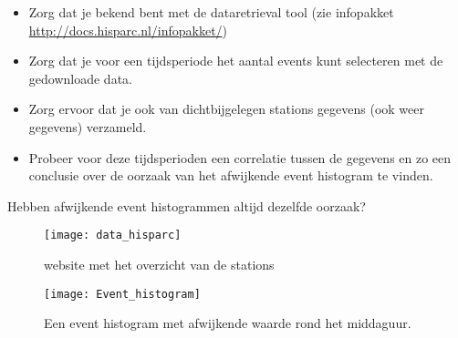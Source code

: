 \begin{questions}
\begin{EnvUplevel}
\begin{itemize}
    \item Zorg dat je bekend bent met de dataretrieval tool
    (zie infopakket \url{http://docs.hisparc.nl/infopakket/})
    \item Zorg dat je voor een tijdsperiode het aantal events kunt selecteren met de gedownloade data.
    \item Zorg ervoor dat je ook van dichtbijgelegen stations gegevens (ook
    weer gegevens) verzameld.
    \item Probeer voor deze tijdsperioden een
    correlatie tussen de gegevens en zo een conclusie over de oorzaak van
    het afwijkende event histogram te vinden.
\end{itemize}
\end{EnvUplevel}



\question Hebben afwijkende event histogrammen altijd dezelfde oorzaak?

\begin{figure}
    \centering
    \texttt{[image: data\_hisparc]}
    \caption{website met het overzicht van de stations}
    \label{fig:data_hisparc}
\end{figure}

\begin{figure}
    \centering
    \texttt{[image: Event\_histogram]} \caption{Een
    event histogram met afwijkende waarde rond het middaguur.}
    \label{fig:Event_histogram}
\end{figure}

\end{questions}

